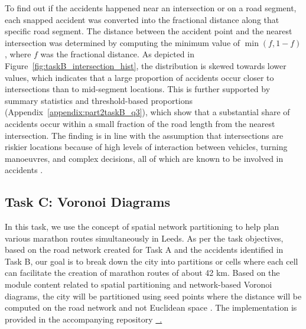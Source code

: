 \documentclass[acmsmall,nonacm,natbib=false]{acmart}
\newcommand{\githublink}[2]{\href{#1}{\faGithub\ #2}}
\begin{document}
To find out if the accidents happened near an intersection or on a road segment, each snapped accident was converted into the fractional distance along that specific road segment. The distance between the accident point and the nearest intersection was determined by computing the minimum value of $\min(f, 1-f)$, where $f$ was the fractional distance.
As depicted in Figure~\ref{fig:taskB_intersection_hist}, the distribution is skewed towards lower values, which indicates that a large proportion of accidents occur closer to intersections than to mid-segment locations.
This is further supported by summary statistics and threshold-based proportions (Appendix~\ref{appendix:part2taskB_q3}), which show that a substantial share of accidents occur within a small fraction of the road length from the nearest intersection.
The finding is in line with the assumption that intersections are riskier locations because of high levels of interaction between vehicles, turning manoeuvres, and complex decisions, all of which are known to be involved in accidents \cite{okabe2000spatial}.

\subsection{\LARGE{Task C: Voronoi Diagrams}}
\leavevmode \par \noindent
In this task, we use the concept of spatial network partitioning to help plan various marathon routes simultaneously in Leeds. As per the task objectives, based on the road network created for Task A and the accidents identified in Task B, our goal is to break down the city into partitions or cells where each cell can facilitate the creation of marathon routes of about 42 km. Based on the module content related to spatial partitioning and network-based Voronoi diagrams, the city will be partitioned using seed points where the distance will be computed on the road network and not Euclidean space \cite{okabe2000spatial}. The implementation is provided in the accompanying repository \githublink{https://github.kcl.ac.uk/k25038453/network-data-analysis-coursework/blob/main/notebooks/part\_2/taskB.ipynb}.
\end{document}
